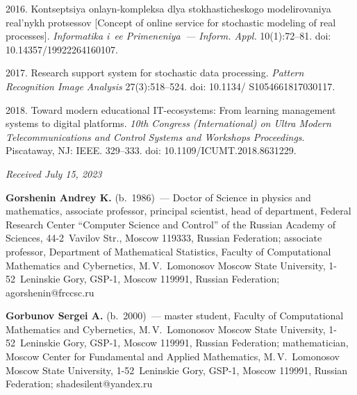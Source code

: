 \begin{multicols}{2}
{{\begin{thebibliography}{99}
 2016. 
Kon\-tsep\-tsiya onlayn-kompleksa dlya sto\-kha\-sti\-che\-sko\-go mo\-de\-li\-ro\-va\-niya real'\-nykh pro\-tses\-sov 
[Concept of online service for stochastic modeling of real processes]. \textit{Informatika i~ee Primeneniya~--- Inform. Appl.} 10(1):72--81. 
doi: 10.14357/19922264160107.

2017. Research support system for stochastic data processing. 
\textit{Pattern Recognition Image Analysis} 27(3):518--524. doi: 10.1134/ S1054661817030117.

 2018. Toward modern educational IT-ecosystems: From learning management systems to digital platforms. 
\textit{10th  Congress (International) on Ultra Modern Telecommunications and Control Systems and Workshops Proceedings}. 
Piscataway, NJ: IEEE. 329--333. doi: 10.1109/\mbox{ICUMT}.2018.8631229.

\end{thebibliography}

 }
 }

\end{multicols}

\vspace*{-6pt}

\hfill{\small\textit{Received July 15, 2023}} 

\vspace*{-12pt}

\Contr

\noindent
\textbf{Gorshenin Andrey K.} (b.\ 1986)~--- Doctor of Science in physics and mathematics, 
associate professor, principal scientist, head of department, 
Federal Research Center ``Computer Science and Control'' of the Russian Academy of Sciences, 44-2~Vavilov Str., 
Moscow 119333, Russian Federation; associate professor, Department of Mathematical Statistics, 
Faculty of Computational Mathematics and Cybernetics, M.\,V.~Lomonosov Moscow State University, 
1-52~Leninskie Gory, GSP-1, Moscow 119991, Russian Federation; \mbox{agorshenin@frccsc.ru}

\vspace*{3pt}

\noindent
\textbf{Gorbunov Sergei A.} (b.\ 2000)~--- master student, Faculty of Computational Mathematics and Cybernetics, 
M.\,V.~Lomonosov Moscow State University, 1-52~Leninskie Gory, GSP-1, Moscow 119991, Russian Federation; 
mathematician, Moscow Center for Fundamental and Applied Mathematics, M.\,V.~Lomonosov Moscow State University, 
1-52~Leninskie Gory, GSP-1, Moscow 119991, Russian Federation; \mbox{shadesilent@yandex.ru}

